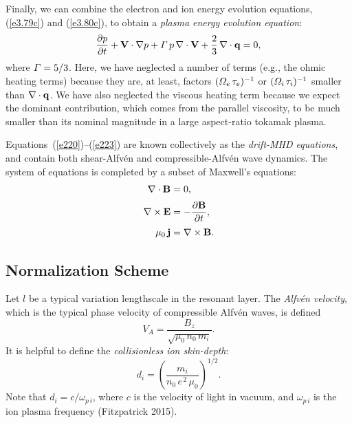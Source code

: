 \documentclass[notitlepage,12pt]{article}
\begin{document}
Finally, we can combine the electron and ion energy evolution equations, (\ref{e3.79c}) and (\ref{e3.80c}), to obtain
a {\em plasma energy evolution equation}:
\begin{equation}
\frac{\partial p}{\partial t} + {\bf V}\cdot\nabla p + {\mit\Gamma}\,p\,\nabla\cdot{\bf V} + \frac{2}{3}\,\nabla\cdot {\bf q}=0, 
\label{e223}
\end{equation}
where ${\mit\Gamma}=5/3$. Here, we have neglected a number of  terms (e.g., the ohmic heating terms) because they
are, at least, factors $({\mit\Omega}_e\,\tau_e)^{-1}$ or  $({\mit\Omega}_i\,\tau_i)^{-1}$ smaller than $\nabla\cdot{\bf q}$. We have also neglected the viscous heating term because we
expect the dominant contribution, which comes from the parallel viscosity, to be much smaller than its nominal magnitude in a large aspect-ratio tokamak
plasma. 

Equations~(\ref{e220})--(\ref{e223}) are known collectively as the {\em drift-MHD equations}, and contain both shear-Alfv\'{e}n
and compressible-Alfv\'{e}n wave dynamics. The system of equations is completed by a subset of Maxwell's equations:
\begin{align}
\nabla\cdot{\bf B} &= 0,\\[0.5ex]
\nabla\times {\bf E} &= - \frac{\partial {\bf B}}{\partial t},\\[0.5ex]
\mu_0\,{\bf j} &= \nabla \times {\bf B}.\label{e226}
\end{align}

\subsection{Normalization Scheme}\label{s4.3}
Let $l$ be a typical variation lengthscale in the resonant layer. The {\em Alfv\'{e}n velocity}, which is the typical phase
velocity of compressible Alfv\'{e}n waves, is defined
\begin{equation}\label{e226a}
V_A = \frac{B_z}{\sqrt{\mu_0\,n_0\,m_i}}.
\end{equation}
It is helpful to define the  {\em collisionless ion skin-depth}: 
\begin{equation}
d_i = \left(\frac{m_i}{n_0\,e^{\,2}\,\mu_0}\right)^{1/2}.
\end{equation}
Note that $d_i=c/\omega_{p\,i}$, where $c$ is the velocity of light in vacuum, and $\omega_{p\,i}$ is the ion plasma
frequency (Fitzpatrick 2015). 
\end{document}
